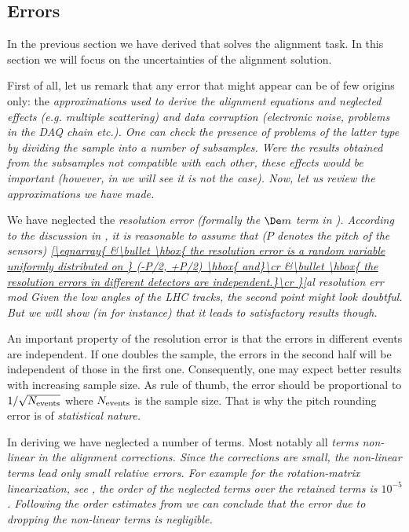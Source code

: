 \subsection[al err]{Errors}

In the previous section we have derived  that solves the alignment task. In this section we will focus on the uncertainties of the alignment solution.

First of all, let us remark that any error that might appear can be of few origins only: the \em{approximations} used to derive the alignment equations and \em{neglected effects} (e.g. multiple scattering) and \em{data corruption} (electronic noise, problems in the DAQ chain etc.). One can check the presence of problems of the latter type by dividing the sample into a number of subsamples. Were the results obtained from the subsamples not compatible with each other, these effects would be important (however, in  we will see it is not the case). Now, let us review the approximations we have made.

\> We have neglected the \em{resolution error} (formally the $\De m$ term in ). According to the discussion in , it is reasonable to assume that ($P$ denotes the pitch of the sensors)
\eqref{\eqnarray{
	&\bullet \hbox{ the resolution error is a random variable uniformly distributed on } (-P/2, +P/2) \hbox{ and}\cr
	&\bullet \hbox{ the resolution errors in different detectors are independent.}\cr
}}{al resolution err mod}
Given the low angles of the LHC tracks, the second point might look doubtful. But we will show (in  for instance) that it leads to satisfactory results though.

\par\parindent\itindent\indent\hang
An important property of the resolution error is that the errors in different events are independent. If one doubles the sample, the errors in the second half will be independent of those in the first one. Consequently, one may expect better results with increasing sample size. As rule of thumb, the error should be proportional to $1/\sqrt{N_{\rm events}}$ where $N_{\rm events}$ is the sample size. That is why the pitch rounding error is of \em{statistical nature}.

\> In deriving  we have neglected a number of terms. Most notably all \em{terms non-linear in the alignment corrections}. Since the corrections are small, the non-linear terms lead only small relative errors. For example for the rotation-matrix linearization, see , the order of the neglected terms over the retained terms is $10^{-5}$. Following the order estimates from  we can conclude that the error due to dropping the non-linear terms is negligible.

